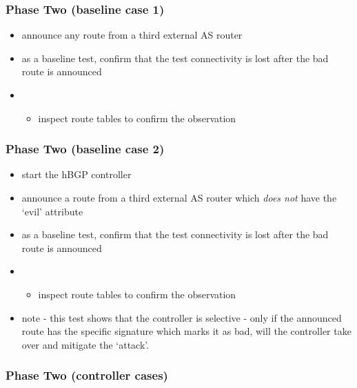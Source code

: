 \subsubsection{Phase Two (baseline case 1)}
\begin{itemize}
    \item announce any route from a third external AS router
    \item as a baseline test, confirm that the test connectivity is lost after the bad route is announced
    \item \begin{itemize}
        \item inspect route tables to confirm the observation
    \end{itemize}
\end{itemize}


\subsubsection{Phase Two (baseline case 2)}

\begin{itemize}
    \item start the hBGP controller
    \item announce a route from a third external AS router which \textit{does not} have the `evil' attribute
    \item as a baseline test, confirm that the test connectivity is lost after the bad route is announced
    \item \begin{itemize}
        \item inspect route tables to confirm the observation
    \end{itemize}
    \item note - this test shows that the controller is selective - only if the announced route has the specific signature which marks it as bad, will the controller take over and mitigate the `attack'.
\end{itemize}

\subsubsection{Phase Two (controller cases)}

